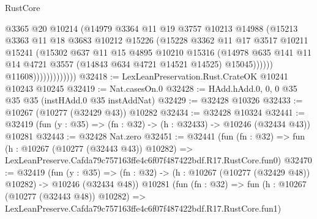 \begin{lexlean}{RustCore}
\begin{coremodule}
                                @3365
                                @20
                                @10214
                                (@14979
                                  @3364
                                  @11
                                  @19
                                  @3757
                                  @10213
                                  @14988
                                  (@15213
                                    @3363
                                    @11
                                    @18
                                    @3683
                                    @10212
                                    @15226
                                    (@15228
                                      @3362
                                      @11
                                      @17
                                      @3517
                                      @10211
                                      @15241
                                      (@15302
                                        @637
                                        @11
                                        @15
                                        @4895
                                        @10210
                                        @15316
                                        (@14978
                                          @635
                                          @141
                                          @11
                                          @14
                                          @4721
                                          @3557
                                          (@14843 @634 @4721 @14521 @14525)
                                          @15045))))))
                              @11608)))))))))))))
@32418 := LexLeanPreservation.Rust.CrateOK @10241 @10243 @10245
@32419 := Nat.casesOn.{0}
@32428 := HAdd.hAdd.{0, 0, 0} @35 @35 @35 (instHAdd.{0} @35 instAddNat)
@32429 := @32428 @10326
@32433 := @10267 (@10277 (@32429 @43)) @10282
@32434 := @32428 @10324
@32441 := @32419 (fun (y : @35) => (fn : @32) -> (h : @32433) -> @10246 (@32434 @43)) @10281
@32443 := @32428 Nat.zero
@32451 := @32441
    (fun (fn : @32) =>
    fun (h : @10267 (@10277 (@32443 @43)) @10282) =>
    LexLeanPreserve.Cafda79c757163ffe4c6f07f487422bdf.R17.RustCore.fun0)
@32470 := @32419
    (fun (y : @35) =>
    (fn : @32) -> (h : @10267 (@10277 (@32429 @48)) @10282) -> @10246 (@32434 @48))
    @10281
    (fun (fn : @32) =>
    fun (h : @10267 (@10277 (@32443 @48)) @10282) =>
    LexLeanPreserve.Cafda79c757163ffe4c6f07f487422bdf.R17.RustCore.fun1)

\end{coremodule}
\end{lexlean}
